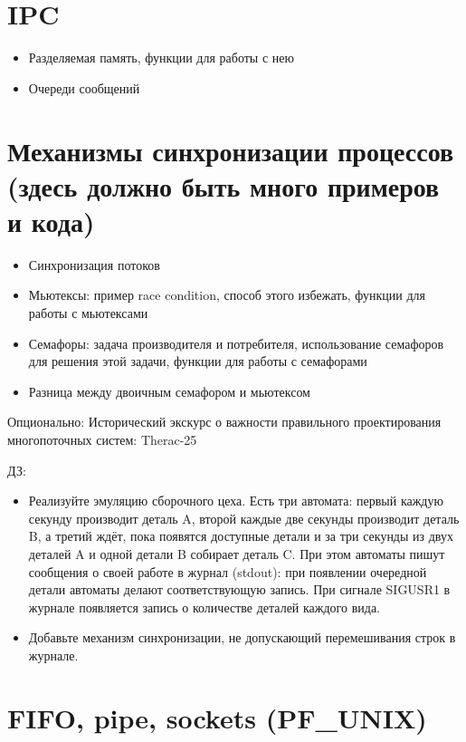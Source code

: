 \documentclass{article}
\begin{document}
\section{IPC}

    \begin{itemize}
        \item Разделяемая память, функции для работы с нею
        \item Очереди сообщений
    \end{itemize}

\section{Механизмы синхронизации процессов (здесь должно быть много примеров и кода)}

    \begin{itemize}
        \item Синхронизация потоков
        \item Мьютексы: пример race condition, способ этого избежать, функции для работы с мьютексами
        \item Семафоры: задача производителя и потребителя, использование семафоров для решения этой задачи, функции для работы с семафорами
        \item Разница между двоичным семафором и мьютексом
    \end{itemize}

    Опционально: Исторический экскурс о важности правильного проектирования многопоточных систем: Therac-25
       
    ДЗ:
    \begin{itemize}
        \item Реализуйте эмуляцию сборочного цеха. Есть три автомата: первый каждую секунду производит деталь A, второй каждые две секунды
                производит деталь B, а третий ждёт, пока появятся доступные детали и за три секунды из двух деталей A и одной детали B собирает
                деталь C. При этом автоматы пишут сообщения о своей работе в журнал (stdout): при появлении очередной детали автоматы делают
                соответствующую запись. При сигнале SIGUSR1 в журнале появляется запись о количестве деталей каждого вида.
       
        \item Добавьте механизм синхронизации, не допускающий перемешивания строк в журнале.
    \end{itemize}

\section{FIFO, pipe, sockets (PF\_UNIX)}
\end{document}

